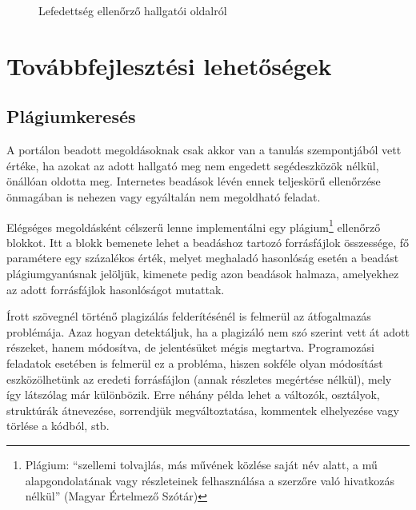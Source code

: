 \begin{figure}[h]
    \centering
    \caption{Lefedettség ellenőrző hallgatói oldalról}
    \label{fig:jporta_codecov_result2}
\end{figure} 



\section{Továbbfejlesztési lehetőségek}

\subsection{Plágiumkeresés}

A portálon beadott megoldásoknak csak akkor van a tanulás szempontjából vett értéke, ha azokat az adott hallgató meg nem engedett segédeszközök nélkül, önállóan oldotta meg. Internetes beadások lévén ennek teljeskörű ellenőrzése önmagában is nehezen vagy egyáltalán nem megoldható feladat. 

Elégséges megoldásként célszerű lenne implementálni egy plágium\footnote{Plágium: ``szellemi tolvajlás, más művének közlése saját név alatt, a mű alapgondolatának vagy részleteinek felhasználása a szerzőre való hivatkozás nélkül'' (Magyar Értelmező Szótár)} ellenőrző blokkot. Itt a blokk bemenete lehet a beadáshoz tartozó forrásfájlok összessége, fő paramétere egy százalékos érték, melyet meghaladó hasonlóság esetén a beadást plágiumgyanúsnak jelöljük, kimenete pedig azon beadások halmaza, amelyekhez az adott forrásfájlok hasonlóságot mutattak.

Írott szövegnél történő plagizálás felderítésénél is felmerül az átfogalmazás problémája. Azaz hogyan detektáljuk, ha a plagizáló nem szó szerint vett át adott részeket, hanem módosítva, de jelentésüket mégis megtartva. Programozási feladatok esetében is felmerül ez a probléma, hiszen sokféle olyan módosítást eszközölhetünk az eredeti forrásfájlon (annak részletes megértése nélkül), mely így látszólag már különbözik. Erre néhány példa lehet a változók, osztályok, struktúrák átnevezése, sorrendjük megváltoztatása, kommentek elhelyezése vagy törlése a kódból, stb.

